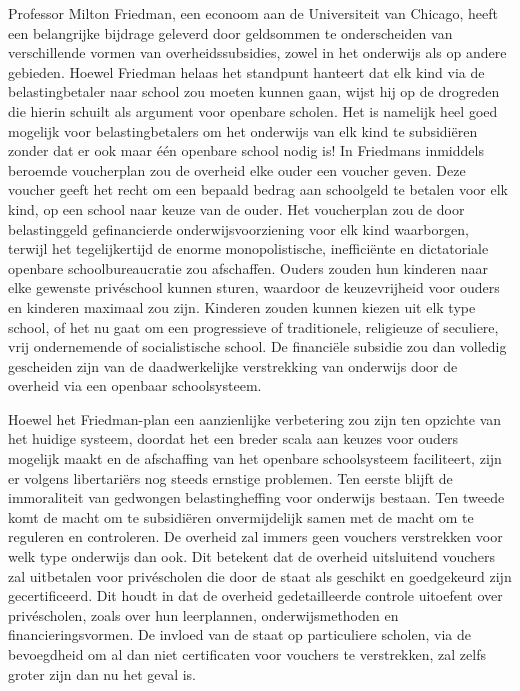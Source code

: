 \documentclass[
  a5paper,
  smalldemyvopaper,10pt,twoside,onecolumn,openright,extrafontsizes,hidelinks]{memoir}
\begin{document}
Professor Milton Friedman, een econoom aan de Universiteit van Chicago,
heeft een belangrijke bijdrage geleverd door geldsommen te onderscheiden
van verschillende vormen van overheidssubsidies, zowel in het onderwijs
als op andere gebieden. Hoewel Friedman helaas het standpunt hanteert
dat elk kind via de belastingbetaler naar school zou moeten kunnen gaan,
wijst hij op de drogreden die hierin schuilt als argument voor openbare
scholen. Het is namelijk heel goed mogelijk voor belastingbetalers om
het onderwijs van elk kind te subsidiëren zonder dat er ook maar één
openbare school nodig is! In Friedmans inmiddels beroemde voucherplan
zou de overheid elke ouder een voucher geven. Deze voucher geeft het
recht om een bepaald bedrag aan schoolgeld te betalen voor elk kind, op
een school naar keuze van de ouder. Het voucherplan zou de door
belastinggeld gefinancierde onderwijsvoorziening voor elk kind
waarborgen, terwijl het tegelijkertijd de enorme monopolistische,
inefficiënte en dictatoriale openbare schoolbureaucratie zou afschaffen.
Ouders zouden hun kinderen naar elke gewenste privéschool kunnen sturen,
waardoor de keuzevrijheid voor ouders en kinderen maximaal zou zijn.
Kinderen zouden kunnen kiezen uit elk type school, of het nu gaat om een
progressieve of traditionele, religieuze of seculiere, vrij ondernemende
of socialistische school. De financiële subsidie zou dan volledig
gescheiden zijn van de daadwerkelijke verstrekking van onderwijs door de
overheid via een openbaar schoolsysteem.

Hoewel het Friedman-plan een aanzienlijke verbetering zou zijn ten
opzichte van het huidige systeem, doordat het een breder scala aan
keuzes voor ouders mogelijk maakt en de afschaffing van het openbare
schoolsysteem faciliteert, zijn er volgens libertariërs nog steeds
ernstige problemen. Ten eerste blijft de immoraliteit van gedwongen
belastingheffing voor onderwijs bestaan. Ten tweede komt de macht om te
subsidiëren onvermijdelijk samen met de macht om te reguleren en
controleren. De overheid zal immers geen vouchers verstrekken voor welk
type onderwijs dan ook. Dit betekent dat de overheid uitsluitend
vouchers zal uitbetalen voor privéscholen die door de staat als geschikt
en goedgekeurd zijn gecertificeerd. Dit houdt in dat de overheid
gedetailleerde controle uitoefent over privéscholen, zoals over hun
leerplannen, onderwijsmethoden en financieringsvormen. De invloed van de
staat op particuliere scholen, via de bevoegdheid om al dan niet
certificaten voor vouchers te verstrekken, zal zelfs groter zijn dan nu
het geval is.
\end{document}
